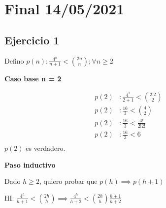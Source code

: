 
\usepackage{caratula}
\usepackage{enumerate}
\usepackage{hyperref}
\usepackage{graphicx}
\usepackage{amsfonts}
\usepackage{enumitem}
\usepackage{amsmath}

\decimalpoint
\hypersetup{colorlinks=true, linkcolor=black, urlcolor=blue}
\setlength{\parindent}{0em}
\setlength{\parskip}{0.5em}
\setcounter{tocdepth}{3} %
\setcounter{section}{0} %
\renewcommand{\thesubsubsection}{\thesubsection.\Alph{subsubsection}}
\graphicspath{ {images/} }





\maketitle
\newpage

\tableofcontents
\newpage

\section{Final 14/05/2021}

\subsection{Ejercicio 1}

Defino $ p(n): \frac{4^n}{n+1} < \binom{2n}{n}; \forall n \geq 2 $

\textbf{Caso base n = 2}

\begin{align*}
    p(2)&: \frac{4^2}{2+1} < \binom{2.2}{2} \\
    p(2)&: \frac{16}{3} < \binom{4}{2} \\
    p(2)&: \frac{16}{3} < \frac{4!}{2!2!} \\
    p(2)&: \frac{16}{3} < 6 \\
\end{align*}
$ p(2) $ es verdadero.

\textbf{Paso inductivo}

Dado $ h \geq 2 $, quiero probar que $ p(h) \implies p(h+1) $

HI: $ \frac{4^h}{h+1} < \binom{2h}{h} \implies \frac{4^h}{h+2} < \binom{2h}{h}\frac{h+1}{h+2} $

